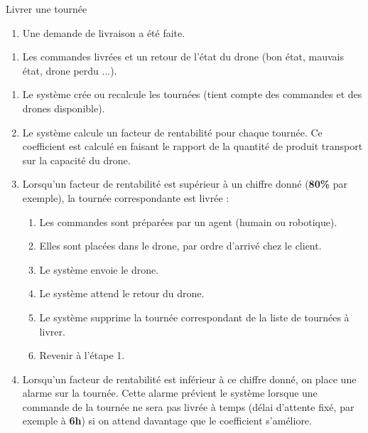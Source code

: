 ﻿\begin{UseCase}{Livrer une tournée}



\begin{UseCasePre}
    \begin{enumerate}
        \item Une demande de livraison a été faite.
    \end{enumerate}
\end{UseCasePre}

\begin{UseCasePost}
    \begin{enumerate}
        \item Les commandes livrées et un retour de l'état du drone (bon état,
            mauvais état, drone perdu ...).
    \end{enumerate}
\end{UseCasePost}

\begin{UseCaseScenario}
    \begin{enumerate}
        \item Le système crée ou recalcule les tournées (tient compte des
            commandes et des drones disponible).
        \item Le système calcule un facteur de rentabilité pour chaque tournée.
            Ce coefficient est calculé en faisant le rapport de la quantité de
            produit transport sur la capacité du drone.
        \item Lorsqu'un facteur de rentabilité est supérieur à un chiffre
            donné (\textbf{80\%} par exemple), la tournée correspondante est livrée :
            \begin{enumerate}[label={\theenumi\alph*.}]
                \item Les commandes sont préparées par un agent (humain ou
                    robotique).
                \item Elles sont placées dans le drone, par ordre d'arrivé chez
                    le client.
                \item Le système envoie le drone.
                \item Le système attend le retour du drone.
                \item Le système supprime la tournée correspondant de la liste
                    de tournées à livrer.
                \item Revenir à l'étape 1.
            \end{enumerate}
        \item Lorsqu'un facteur de rentabilité est inférieur à ce chiffre
            donné, on place une alarme sur la tournée. Cette alarme prévient le
            système lorsque une commande de la tournée ne sera pas livrée à
            temps (délai d'attente fixé, par exemple à \textbf{6h}) si on
            attend davantage que le coefficient s'améliore.
    \end{enumerate}
\end{UseCaseScenario}


\end{UseCase}
